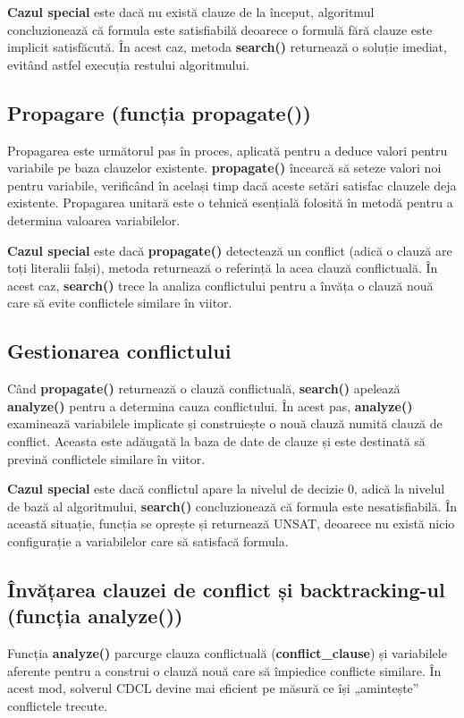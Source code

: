 \documentclass[runningheads]{llncs}
\begin{document}
\textbf{Cazul special} este dacă nu există clauze de la început, algoritmul concluzionează că formula este satisfiabilă deoarece o formulă fără clauze este implicit satisfăcută. În acest caz, metoda \textbf{search()} returnează o soluție imediat, evitând astfel execuția restului algoritmului.

\subsection{Propagare (funcția propagate())} Propagarea este următorul pas în proces, aplicată pentru a deduce valori pentru variabile pe baza clauzelor existente. \textbf{propagate()} încearcă să seteze valori noi pentru variabile, verificând în același timp dacă aceste setări satisfac clauzele deja existente. Propagarea unitară este o tehnică esențială folosită în metodă pentru a determina valoarea variabilelor.

\textbf{Cazul special} este dacă \textbf{propagate()} detectează un conflict (adică o clauză are toți literalii falși), metoda returnează o referință la acea clauză conflictuală. În acest caz, \textbf{search()} trece la analiza conflictului pentru a învăța o clauză nouă care să evite conflictele similare în viitor.

\subsection{Gestionarea conflictului} Când \textbf{propagate()} returnează o clauză conflictuală, \textbf{search()} apelează \textbf{analyze()} pentru a determina cauza conflictului. În acest pas, \textbf{analyze()} examinează variabilele implicate și construiește o nouă clauză numită clauză de conflict. Aceasta este adăugată la baza de date de clauze și este destinată să prevină conflictele similare în viitor.

\textbf{Cazul special} este dacă conflictul apare la nivelul de decizie 0, adică la nivelul de bază al algoritmului, \textbf{search()} concluzionează că formula este nesatisfiabilă. În această situație, funcția se oprește și returnează UNSAT, deoarece nu există nicio configurație a variabilelor care să satisfacă formula.

\subsection{Învățarea clauzei de conflict și backtracking-ul (funcția analyze())} Funcția \textbf{analyze()} parcurge clauza conflictuală (\textbf{conflict\_clause}) și variabilele aferente pentru a construi o clauză nouă care să împiedice conflicte similare. În acest mod, solverul CDCL devine mai eficient pe măsură ce își „amintește” conflictele trecute.
\end{document}
